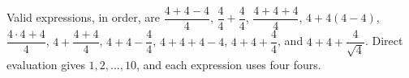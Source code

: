 Valid expressions, in order, are $\dfrac{4+4-4}{4}$, $\dfrac{4}{4}+\dfrac{4}{4}$, $\dfrac{4+4+4}{4}$, $4+4(4-4)$, $\dfrac{4\cdot4+4}{4}$, $4+\dfrac{4+4}{4}$, $4+4-\dfrac{4}{4}$, $4+4+4-4$, $4+4+\dfrac{4}{4}$, and $4+4+\dfrac{4}{\sqrt4}$. Direct evaluation gives $1,2,\ldots,10$, and each expression uses four fours.
